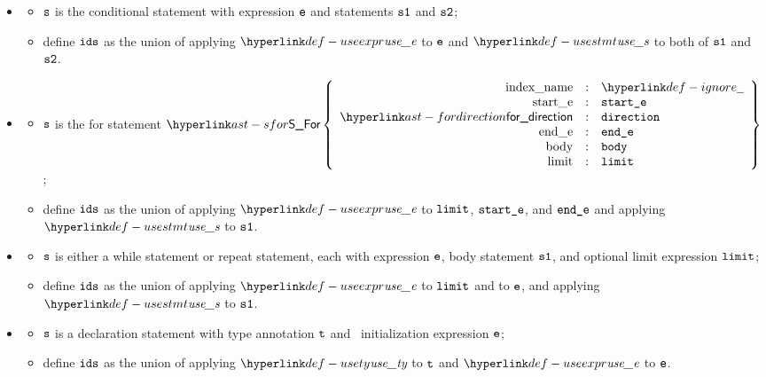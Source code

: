 \begin{itemize}
  \item {}
  \begin{itemize}
    \item $\texttt{s}$ is the conditional statement with expression $\texttt{e}$ and statements $\texttt{s1}$ and $\texttt{s2}$;
    \item define $\texttt{ids}$ as the union of applying $\useexpr$ to $\texttt{e}$ and $\usestmt$ to both of $\texttt{s1}$ and $\texttt{s2}$.
  \end{itemize}

  \item {}
  \begin{itemize}
    \item $\texttt{s}$ is the for statement $\SFor\left\{\begin{array}{rcl}
      \Forindexname &:& \Ignore\\
      \Forstarte &:& \vstarte\\
      \fordirection &:& \vdirection\\
      \Forende &:& \vende\\
      \Forbody &:& \vbody\\
      \Forlimit &:& \vlimit
    \end{array}\right\}$;
    \item define $\texttt{ids}$ as the union of applying $\useexpr$ to $\texttt{limit}$, $\texttt{start\_e}$, and $\texttt{end\_e}$ and applying $\usestmt$ to $\texttt{s1}$.
  \end{itemize}

  \item {}
  \begin{itemize}
    \item $\texttt{s}$ is either a while statement or repeat statement, each with expression $\texttt{e}$, body statement $\texttt{s1}$,
          and optional limit expression $\texttt{limit}$;
    \item define $\texttt{ids}$ as the union of applying $\useexpr$ to $\texttt{limit}$ and to $\texttt{e}$, and applying $\usestmt$ to $\texttt{s1}$.
  \end{itemize}

  \item {}
  \begin{itemize}
    \item $\texttt{s}$ is a declaration statement with \optional{} type annotation $\texttt{t}$ and \optional\ initialization expression $\texttt{e}$;
    \item define $\texttt{ids}$ as the union of applying $\usety$ to $\texttt{t}$ and $\useexpr$ to $\texttt{e}$.
  \end{itemize}


\end{itemize}
